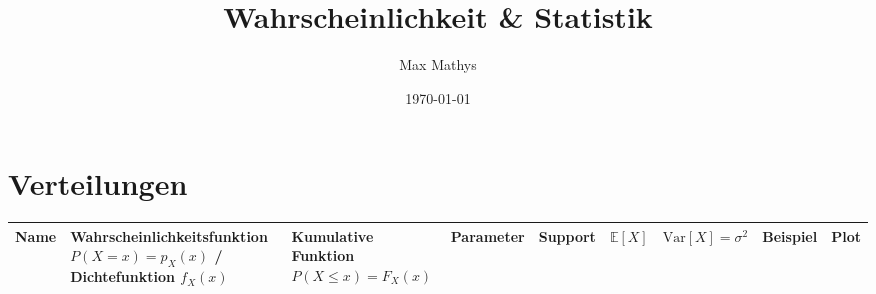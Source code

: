 \documentclass[11pt]{article}
\begin{document}
\author{Max Mathys}
\title{Wahrscheinlichkeit \& Statistik}

\date{\today}

\setcounter{page}{1}
\setcounter{part}{3}
\part{Verteilungen}

\begin{tabu} to \textwidth { | X[l] | X[l] | X[l] | X[l] | X[l] | X[l] | X[l] | X[l] | X[l] | }
 \hline
 
 Name & Wahrscheinlichkeitsfunktion $P(X=x) = p_X(x)	$ / Dichtefunktion $f_X(x)$ & Kumulative Funktion $P(X\leq x) = F_X(x)$ & Parameter & Support & $\mathbb{E}[X]$ & $\text{Var}[X] = \sigma^2$ & Beispiel & Plot \\ [0.5ex] 
 \hline
\end{tabu}
\end{document}
